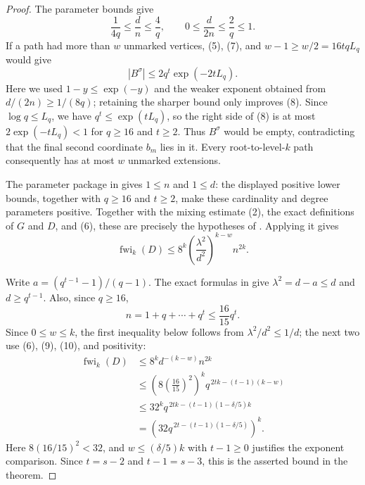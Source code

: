 \begin{proof}
The parameter bounds give
\[
 \frac1{4q}\leq\frac dn\leq\frac4q,
 \qquad 0\leq\frac d{2n}\leq\frac2q\leq1. \tag{7}
\]
If a path had more than $w$ unmarked vertices, (5), (7), and
$w-1\geq w/2=16tqL_q$ would give
\[
 |B^\sigma|
 \leq 2q^t\exp(-2tL_q). \tag{8}
\]
Here we used $1-y\leq\exp(-y)$ and the weaker exponent obtained from
$d/(2n)\geq1/(8q)$; retaining the sharper bound only improves (8).
Since $\log q\leq L_q$, we have $q^t\leq\exp(tL_q)$, so the right side of
(8) is at most $2\exp(-tL_q)<1$ for $q\geq16$ and $t\geq2$.  Thus
$B^\sigma$ would be empty, contradicting that the final second coordinate
$b_m$ lies in it.  Every root-to-level-$k$ path consequently has at most
$w$ unmarked extensions.

The parameter package in  gives
$1\leq n$ and $1\leq d$: the displayed positive lower bounds, together
with $q\geq16$ and $t\geq2$, make these cardinality and degree parameters
positive.  Together with the mixing estimate (2), the exact definitions of
$G$ and $D$, and (6), these are precisely the hypotheses of
.  Applying it gives
\[
 \operatorname{fwi}_k(D)\leq
 8^k\left(\frac{\lambda^2}{d^2}\right)^{k-w}n^{2k}. \tag{9}
\]

Write $a=(q^{t-1}-1)/(q-1)$.  The exact formulas in
 give $\lambda^2=d-a\leq d$ and
$d\geq q^{t-1}$.  Also, since $q\geq16$,
\[
 n=1+q+\cdots+q^t\leq\frac{16}{15}q^t. \tag{10}
\]
Since $0\leq w\leq k$, the first inequality below follows from
$\lambda^2/d^2\leq1/d$; the next two use (6), (9), (10), and positivity:
\[
\begin{aligned}
 \operatorname{fwi}_k(D)
 &\leq 8^k d^{-(k-w)}n^{2k}\\
 &\leq \left(8\left(\frac{16}{15}\right)^2\right)^k
       q^{\,2tk-(t-1)(k-w)}\\
 &\leq 32^k q^{\,2tk-(t-1)(1-\delta/5)k}\\
 &=\left(32q^{\,2t-(t-1)(1-\delta/5)}\right)^k.
\end{aligned}
\]
Here $8(16/15)^2<32$, and $w\leq(\delta/5)k$ with $t-1\geq0$
justifies the exponent comparison.
Since $t=s-2$ and $t-1=s-3$, this is the asserted bound in the theorem.


\end{proof}
